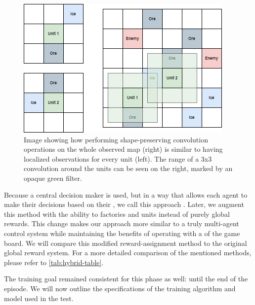\begin{figure}[htbp]
    \centering
    \includegraphics[width=0.7\linewidth]{images/methods_hybrid/feature_extractor/map.png}
    \captionsetup{justification=justified, singlelinecheck=false, width=1\linewidth, labelfont=bf} 
    \caption[]{Image showing how performing shape-preserving convolution operations on the whole observed map (right) is similar to having localized observations for every unit (left). The range of a 3x3 convolution around the units can be seen on the right, marked by an opaque green filter.}
    \label{fig:map}
\end{figure}

\bigskip

\noindent Because a central decision maker is used, but in a way that allows each agent to make their decisions based on their , we call this approach . Later, we augment this method with the ability to  factories and units instead of purely global rewards. This change makes our approach more similar to a truly multi-agent control system while maintaining the benefits of operating with a  of the game board. We will compare this modified reward-assignment method to the original global reward system. For a more detailed comparison of the mentioned methods, please refer to \autoref{tab:hybrid-table}.

\bigskip

\noindent The training goal remained consistent for this phase as well:  until the end of the episode. We will now outline the specifications of the training algorithm and model used in the test.

